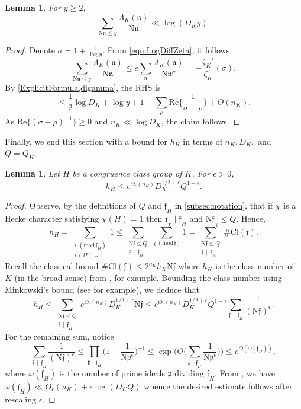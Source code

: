 \documentclass[12pt,psamsfonts]{amsart}
\newtheorem{lem}[thm]{Lemma}
\theoremstyle{definition}
\theoremstyle{remark}
\numberwithin{equation}{section}
\newcounter{notation}
\theoremstyle{plain}
\theoremstyle{remark}
\renewcommand{\1}{ {\bf 1}}
\newcommand{\kf}{\mathfrak{f}}
\renewcommand{\pmod}[1]{\, (\mathrm{mod} {\, #1})}
\newcommand{\kn}{\mathfrak{n}}
\newcommand{\N}{\mathrm{N}}
\newcommand{\kp}{\mathfrak{p}}
\renewcommand{\Re}{\mathrm{Re}}
\begin{document}
\begin{lem} \label{lem:PrimeSum}
	For $y \geq 2$,
	\[
	\sum_{\N\kn \leq y} \frac{\Lambda_K(\kn)}{\N\kn} \ll \log(D_Ky).
	\]	
\end{lem}
\begin{proof}
	Denote $\sigma = 1+ \frac{1}{\log y}$. From \eqref{eqn:LogDiffZeta}, it follows
	\[
	\sum_{\N\kn \leq y} \frac{\Lambda_K(\kn)}{\N\kn} \leq e	\sum_{\kn} \frac{\Lambda_K(\kn)}{\N\kn^\sigma} =  -\frac{\zeta_K'}{\zeta_K}(\sigma). 
	\]
	By \cref{ExplicitFormula,digamma}, the RHS is
	\[
	\leq \frac{1}{2}	\log D_K + \log y + 1 - \sum_{\rho} \Re\Big\{ \frac{1}{\sigma-\rho} \Big\} + O(n_K).
	\]
	As $\Re\{ (\sigma-\rho)^{-1}\} \geq 0$ and $n_K \ll \log D_K$, the claim follows.
\end{proof}
Finally, we end this section with a bound for $h_H$ in terms of $n_K, D_K,$ and $Q=Q_H$.

\begin{lem}
\label{lem:h_H-Bound}
	Let $H$ be a congruence class group of $K$. For $\epsilon > 0$, 
	\[
	h_H \leq e^{O_{\epsilon}(n_K)} D_K^{1/2+\epsilon} Q^{1+\epsilon}.
	\] 
\end{lem}
\begin{proof} Observe, by the definitions of $Q$ and $\mathfrak{f}_H$ in \cref{subsec:notation}, that if $\chi$ is a Hecke character satisfying $\chi(H) = 1$ then $\kf_{\chi} \mid \kf_H$ and $\N\kf_{\chi} \leq Q$. Hence,  
	\[
	h_H = \sum_{ \substack{\chi \pmod{\kf_H} \\ \chi(H) =1} } 1   \leq \sum_{\substack{ \N\kf \leq Q \\ \kf \,\mid\, \kf_H} } \sum_{\chi \pmod{\kf} } 1 = \sum_{\substack{ \N\kf \leq Q \\ \kf \,\mid\, \kf_H} } \#\mathrm{Cl}(\kf). 
	\]	
	Recall the classical bound $\#\mathrm{Cl}(\kf) \leq 2^{n_K} h_K \N\kf$ where $h_K$ is the class number of $K$ (in the broad sense) from \cite[Theorem 1.7]{milneCFT}, for example. Bounding the class number using Minkowski's bound (see \cite[Lemma 1.12]{Weiss} for example), we deduce that
	\[
	h_H \leq \sum_{\substack{ \N\kf \leq Q \\ \kf \,\mid\, \kf_H} } e^{O_{\epsilon}(n_K)} D_K^{1/2+\epsilon} \N\kf \leq e^{O_{\epsilon}(n_K)} D_K^{1/2+\epsilon} Q^{1+\epsilon}  \sum_{ \kf \,\mid\, \kf_H} \frac{1}{(\N\kf)^{\epsilon}}.
	\]
	For the remaining sum, notice 
	\[
	 \sum_{ \kf \,\mid\, \kf_H} \frac{1}{(\N\kf)^{\epsilon}} \leq \prod_{\kp \mid \kf_H} \Big(1-\frac{1}{\N\kp^{\epsilon}} \Big)^{-1} \leq \exp\Big( O\Big( \sum_{\kp \mid \kf_H} \frac{1}{\N\kp^{\epsilon}} \Big) \Big)\leq e^{O(\omega(\kf_H))},
	\]
	where $\omega(\kf_H)$ is the number of prime ideals $\kp$ dividing $\kf_H$. From \cite[Lemma 1.13]{Weiss}, we have $\omega(\kf_H) \ll  O_{\epsilon}(n_K)  + \epsilon \log(D_KQ)$ whence the desired estimate follows after rescaling $\epsilon$. 
\end{proof}
\end{document}
